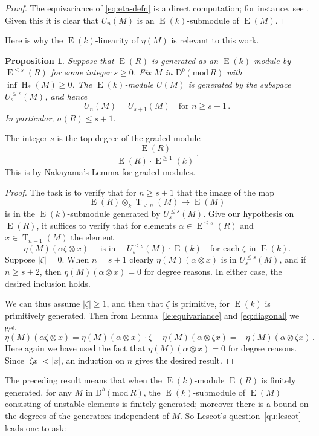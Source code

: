 \documentclass{amsart}
\numberwithin{equation}{section}
\theoremstyle{plain}
\newtheorem{proposition}[equation]{Proposition}
\theoremstyle{definition}
\theoremstyle{remark}
\newcommand{\dbcat}[1]{\mathrm{D}^b(\mathrm{mod}\,{#1})}
\newcommand{\eee}{\operatorname{E}}
\newcommand{\hh}{\operatorname{H}}
\newcommand{\tee}{\operatorname{T}}
\begin{document}
\begin{proof}
    The equivariance of \eqref{eq:eta-defn} is a direct computation; for instance, see  \cite[Corollary~3.5]{Ferraro:2019s}. Given this it is clear that $U_n(M)$ is an $\eee(k)$-submodule of $\eee(M)$.
\end{proof}

Here is why the $\eee(k)$-linearity of $\eta(M)$ is relevant to this work.

\begin{proposition}
\label{pr:fin-gen}
Suppose that $\eee(R)$ is generated as an $\eee(k)$-module  by $\eee^{\leqslant s}(R)$ for some integer $s\ge 0$. 
Fix $M$ in $\dbcat R$ with $\inf\hh_*(M)\ge 0$. The $\eee(k)$-module $U(M)$ is generated by the subspace $U^{\leqslant s}_{s}(M)$, and hence
\[
U_n(M)=U_{s+1}(M)\quad \text{for $n\ge s+1$}\,.
\]
In particular, $\sigma(R)\le s+1$.
\end{proposition}

The integer $s$ is the top degree of the graded module 
\[
\frac{\eee(R)}{\eee(R)\cdot \eee^{\geqslant 1}(k)}\,.
\]
This is by Nakayama's Lemma for graded modules.

\begin{proof}
The task is to verify that for $n\ge s+1$ that the image of the map
\[
\eee(R)\otimes_k \tee_{<n}(M) \longrightarrow \eee(M)
\]
is in the  $\eee(k)$-submodule  generated by $U^{\leqslant s}_{s}(M)$. Give our hypothesis on $\eee(R)$, it suffices to verify that for elements $\alpha\in \eee^{\leqslant s}(R)$ and $x\in \tee_{n-1}(M)$ the element
\[
\eta(M)(\alpha\zeta \otimes x) \quad \text{ is in } \quad U^{\leqslant s}_{s}(M)\cdot \eee(k) \quad \text{for each $\zeta$ in $\eee(k)$}.
\]
Suppose $|\zeta|=0$. When $n=s+1$ clearly $\eta(M)(\alpha\otimes x)$ is in $U^{\leqslant s}_{s}(M)$, and if
$n\ge s+2$, then $\eta(M)(\alpha\otimes x)=0$ for degree reasons.  In either case, the desired inclusion holds.

We can thus assume $|\zeta|\ge 1$, and then that $\zeta$ is primitive, for $\eee(k)$ is primitively generated. Then from Lemma~\ref{le:equivariance} and \eqref{eq:diagonal} we get
\[
\eta(M)(\alpha\zeta\otimes x)  = \eta(M)(\alpha\otimes x) \cdot \zeta - \eta(M)(\alpha\otimes \zeta x) =  - \eta(M)(\alpha\otimes \zeta x) \,. 
\]
Here again we have used the fact that $\eta(M)(\alpha\otimes x)=0$ for degree reasons. Since $|\zeta x|<|x|$, an induction on $n$ gives the desired result.
\end{proof}

The preceding result means that when the $\eee(k)$-module $\eee(R)$ is finitely generated, for any $M$ in $\dbcat R$, the $\eee(k)$-submodule of $\eee(M)$ consisting of unstable elements is finitely generated; moreover there is a bound on the degrees of the generators independent of $M$. So Lescot's question~\ref{qu:lescot} leads one to ask: 
\end{document}
